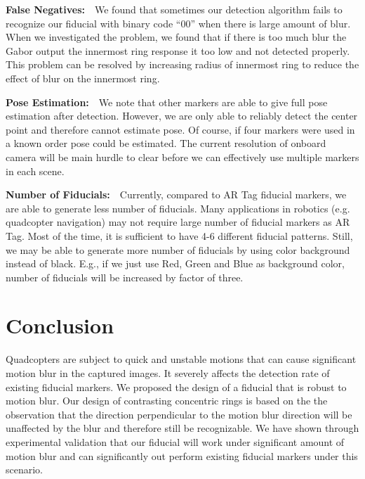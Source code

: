 \documentclass[runningheads]{llncs}
\begin{document}
\noindent\textbf{False Negatives:}~~We found that sometimes our detection
algorithm fails to recognize our fiducial with binary code ``00'' when there is
large amount of blur.  When we
investigated the problem, we found that if there is too much blur the Gabor
output the innermost ring response it too low and not detected properly.  
This problem can be resolved by increasing radius of innermost ring to 
reduce the effect of blur on the innermost ring.  

\noindent\textbf{Pose Estimation:}~~We note that other markers are able to give
full pose estimation after detection.  However, we are only able to reliably detect
the center point and therefore cannot estimate pose.  Of course, if four
markers were used in a known order pose could be estimated. The current
resolution of onboard camera will be main hurdle to clear before we can
effectively use multiple markers in each scene.

\noindent\textbf{Number of Fiducials:}~~Currently, compared to AR Tag fiducial
markers, we are able to generate less number of fiducials. Many applications in
robotics (e.g. quadcopter navigation) may not require large number of fiducial
markers as AR Tag. Most of the time, it is sufficient to have 4-6
different fiducial patterns. Still, we may be able to generate more number of
fiducials by using color background instead of black. E.g., if we just use Red,
Green and Blue as background color, number of fiducials will be increased by
factor of three.

\section{Conclusion}

Quadcopters are subject to quick and unstable motions that can cause significant
motion blur in the captured images. It severely affects the detection rate of
existing fiducial markers. We proposed the design of a fiducial that is robust
to motion blur. Our design of contrasting concentric rings is based on the the
observation that the direction perpendicular to the motion blur direction will
be unaffected by the blur and therefore still be recognizable. We have shown
through experimental validation that our fiducial will work under significant
amount of motion blur and can significantly out perform existing fiducial
markers under this scenario.



\end{document}
